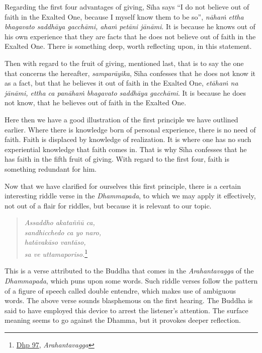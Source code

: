 Regarding the first four advantages of giving, Sīha says ``I do not believe out of faith in the Exalted One, because I myself know them to be so'', \emph{nāhaṁ ettha bhagavato saddhāya gacchāmi, ahaṁ petāni jānāmi}. It is because he knows out of his own experience that they are facts that he does not believe out of faith in the Exalted One. There is something deep, worth reflecting upon, in this statement.

Then with regard to the fruit of giving, mentioned last, that is to say the one that concerns the hereafter, \emph{samparāyika}, Sīha confesses that he does not know it as a fact, but that he believes it out of faith in the Exalted One, \emph{etāhaṁ na jānāmi, ettha ca panāhaṁ bhagavato saddhāya gacchāmi}. It is because he does not know, that he believes out of faith in the Exalted One.

Here then we have a good illustration of the first principle we have outlined earlier. Where there is knowledge born of personal experience, there is no need of faith. Faith is displaced by knowledge of realization. It is where one has no such experiential knowledge that faith comes in. That is why Sīha confesses that he has faith in the fifth fruit of giving. With regard to the first four, faith is something redundant for him.

Now that we have clarified for ourselves this first principle, there is a certain interesting riddle verse in the \emph{Dhammapada}, to which we may apply it effectively, not out of a flair for riddles, but because it is relevant to our topic.

\begin{quote}
\emph{Assaddho akataññū ca,}\\
\emph{sandhicchedo ca yo naro,}\\
\emph{hatāvakāso vantāso,}\\
\emph{sa ve uttamaporiso.}\footnote{\href{https://suttacentral.net/dhp90-99/pli/ms}{Dhp 97}, \emph{Arahantavagga}}
\end{quote}

This is a verse attributed to the Buddha that comes in the \emph{Arahantavagga} of the \emph{Dhammapada}, which puns upon some words. Such riddle verses follow the pattern of a figure of speech called double entendre, which makes use of ambiguous words. The above verse sounds blasphemous on the first hearing. The Buddha is said to have employed this device to arrest the listener's attention. The surface meaning seems to go against the Dhamma, but it provokes deeper reflection.

